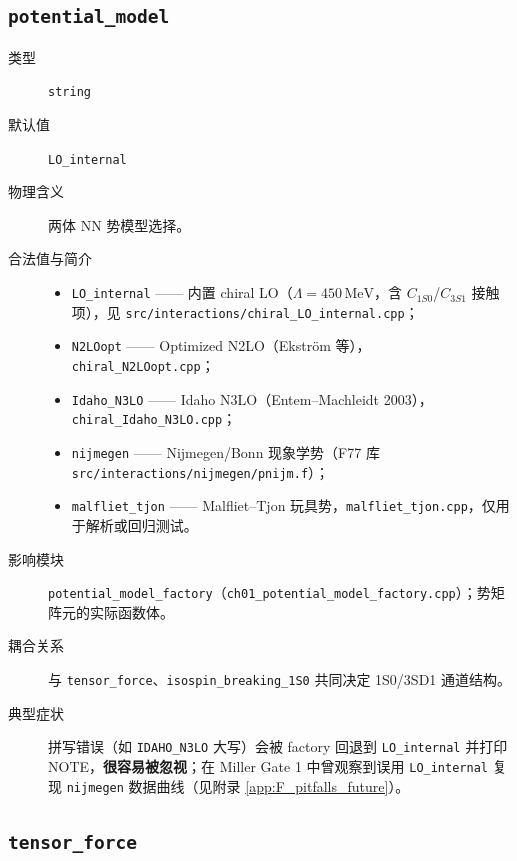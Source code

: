 \subsection{\texttt{potential\_model}}

\begin{description}
  \item[类型] \texttt{string}
  \item[默认值] \texttt{LO\_internal}
  \item[物理含义] 两体 NN 势模型选择。
  \item[合法值与简介]
    \begin{itemize}
      \item \texttt{LO\_internal} —— 内置 chiral LO（\(\Lambda=450\,\mathrm{MeV}\)，含 \(C_{1S0}\)/\(C_{3S1}\) 接触项），见 \texttt{src/interactions/chiral\_LO\_internal.cpp}；
      \item \texttt{N2LOopt} —— Optimized N2LO（Ekström 等），\texttt{chiral\_N2LOopt.cpp}；
      \item \texttt{Idaho\_N3LO} —— Idaho N3LO（Entem–Machleidt 2003），\texttt{chiral\_Idaho\_N3LO.cpp}；
      \item \texttt{nijmegen} —— Nijmegen/Bonn 现象学势（F77 库 \texttt{src/interactions/nijmegen/pnijm.f}）；
      \item \texttt{malfliet\_tjon} —— Malfliet–Tjon 玩具势，\texttt{malfliet\_tjon.cpp}，仅用于解析或回归测试。
    \end{itemize}
  \item[影响模块] \texttt{potential\_model\_factory}（\texttt{ch01\_potential\_model\_factory.cpp}）；势矩阵元的实际函数体。
  \item[耦合关系] 与 \texttt{tensor\_force}、\texttt{isospin\_breaking\_1S0} 共同决定 1S0/3SD1 通道结构。
  \item[典型症状] 拼写错误（如 \texttt{IDAHO\_N3LO} 大写）会被 factory 回退到 \texttt{LO\_internal} 并打印 NOTE，\textbf{很容易被忽视}；在 Miller Gate 1 中曾观察到误用 \texttt{LO\_internal} 复现 \texttt{nijmegen} 数据曲线（见附录 \cref{app:F_pitfalls_future}）。
\end{description}

\subsection{\texttt{tensor\_force}}

